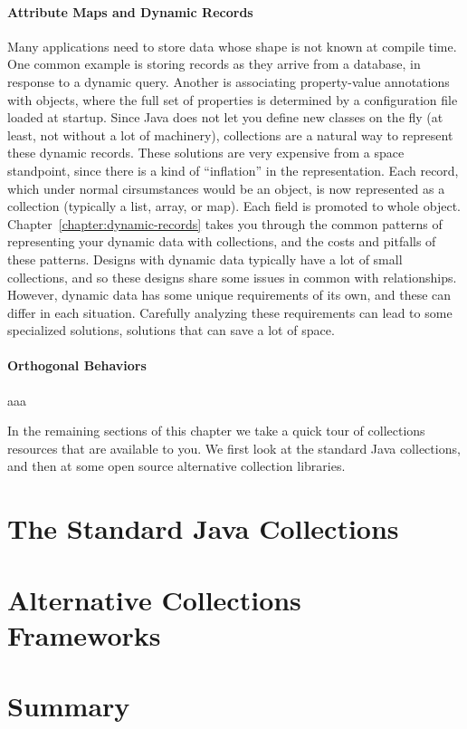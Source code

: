 \paragraph{Attribute Maps and Dynamic Records}
Many applications need to store data whose shape is not
known at compile time. One common example is storing  
records as they arrive from a database, in response to a dynamic query. Another
is associating property-value annotations with
objects, where the full set of properties is determined by a configuration file
loaded at startup.
Since Java does not let you define new classes on the fly (at
least, not without a lot of machinery), collections are a natural way to
represent these dynamic records. These solutions are very expensive from a
space standpoint, since there is a kind of ``inflation'' in the representation. 
Each record, which under normal cirsumstances would be an object, is
now represented as a collection (typically a list, array, or map). Each
field is promoted to whole object.
Chapter~\ref{chapter:dynamic-records} takes you through the
common patterns of representing your dynamic data with collections, and
the costs and pitfalls of these patterns. Designs with dynamic data typically 
have a lot of small collections, and so these designs share some issues in
common with relationships. However, dynamic data has some unique requirements of its
own, and these can differ in each situation. Carefully analyzing these
requirements can lead to some specialized solutions, solutions that can save a
lot of space.

\paragraph{Orthogonal Behaviors}
aaa

In the remaining sections of this chapter we take a quick tour of collections
resources that are available to you.  We first look at the standard Java
collections, and then at some open source alternative collection libraries.

\section{The Standard Java Collections}

\section{Alternative Collections Frameworks}


\section{Summary}

